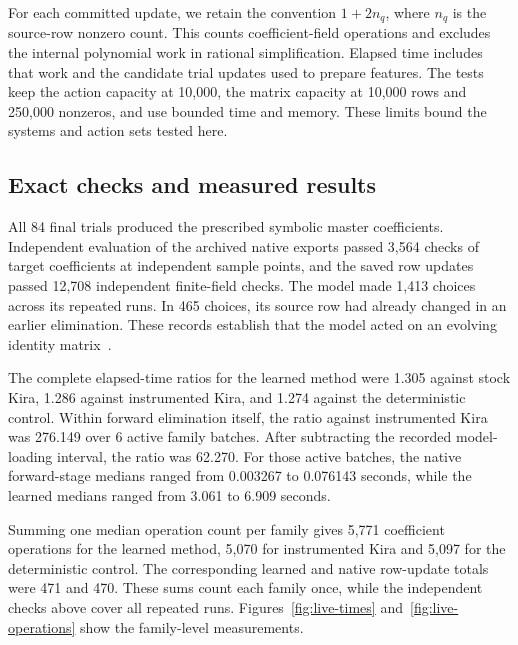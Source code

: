 For each committed update, we retain the convention
$1+2n_q$, where $n_q$ is the source-row nonzero count.
This counts coefficient-field operations and excludes the internal
polynomial work in rational simplification. Elapsed time includes that
work and the candidate trial updates used to prepare features.
The tests keep the action capacity at 10,000, the matrix capacity at
10,000 rows and 250,000 nonzeros, and use bounded time and memory.
These limits bound the systems and action sets tested here.

\subsection{Exact checks and measured results}
All 84 final trials produced the prescribed symbolic master
coefficients. Independent evaluation of the archived native exports
passed 3,564 checks of target coefficients at independent sample
points, and the saved row updates passed
12,708 independent finite-field checks. The model made
1,413 choices across its repeated runs. In 465 choices,
its source row had already changed in an earlier elimination.
These records establish that the model acted on an evolving identity
matrix~\cite{KiraLiveMatrixData}.

The complete elapsed-time ratios for the learned method were
1.305 against stock Kira, 1.286 against instrumented Kira,
and 1.274 against the deterministic control. Within forward
elimination itself, the ratio against instrumented Kira was
276.149 over 6 active family batches. After subtracting the
recorded model-loading interval, the ratio was 62.270.
For those active batches, the native forward-stage medians ranged from
0.003267 to 0.076143 seconds, while the learned medians ranged from
3.061 to 6.909 seconds.

Summing one median operation count per family gives 5,771
coefficient operations for the learned method, 5,070 for
instrumented Kira and 5,097 for the deterministic control.
The corresponding learned and native row-update totals were
471 and 470.
These sums count each family once, while the independent checks above
cover all repeated runs. Figures~\ref{fig:live-times}
and~\ref{fig:live-operations} show the family-level measurements.

